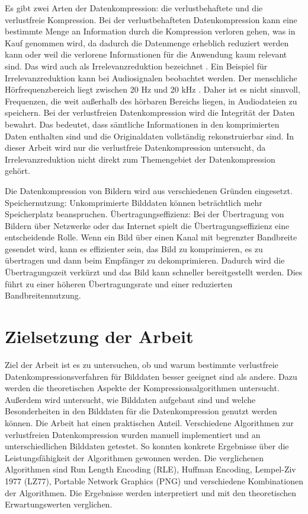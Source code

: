 \documentclass[conference]{IEEEtran}
\begin{document}
Es gibt zwei Arten der Datenkompression: die verlustbehaftete und die verlustfreie Kompression.
Bei der verlustbehafteten Datenkompression kann eine bestimmte Menge an Information durch die
Kompression verloren gehen, was in Kauf genommen wird, da dadurch die Datenmenge erheblich
reduziert werden kann oder weil die verlorene Informationen für die Anwendung kaum relevant sind.
Das wird auch als Irrelevanzreduktion bezeichnet \cite[S. 5]{Maluck}.
Ein Beispiel für Irrelevanzreduktion kann bei Audiosignalen beobachtet werden.
Der menschliche Hörfrequenzbereich liegt zwischen 20 Hz und 20 kHz \cite{Burke}.
Daher ist es nicht sinnvoll, Frequenzen, die weit außerhalb des hörbaren Bereichs liegen,
in Audiodateien zu speichern.
Bei der verlustfreien Datenkompression wird die Integrität der Daten bewahrt.
Das bedeutet, dass sämtliche Informationen in den komprimierten Daten enthalten sind
und die Originaldaten vollständig rekonstruierbar sind.
In dieser Arbeit wird nur die verlustfreie Datenkompression untersucht, da
Irrelevanzreduktion nicht direkt zum Themengebiet der Datenkompression gehört.

Die Datenkompression von Bildern wird aus verschiedenen Gründen eingesetzt.
Speichernutzung: Unkomprimierte Bilddaten können beträchtlich mehr Speicherplatz beanspruchen.
Übertragungseffizienz: Bei der Übertragung von Bildern über Netzwerke oder das Internet spielt
die Übertragungseffizienz eine entscheidende Rolle.
Wenn ein Bild über einen Kanal mit begrenzter Bandbreite gesendet wird, kann es effizienter
sein, das Bild zu komprimieren, es zu übertragen und dann beim Empfänger zu dekomprimieren.
Dadurch wird die Übertragungszeit verkürzt und das Bild kann schneller bereitgestellt werden.
Dies führt zu einer höheren Übertragungsrate und einer reduzierten Bandbreitennutzung.


\section{Zielsetzung der Arbeit}

Ziel der Arbeit ist es zu untersuchen, ob und warum bestimmte verlustfreie
Datenkompressionsverfahren für Bilddaten besser geeignet sind als andere.
Dazu werden die theoretischen Aspekte der Kompressionsalgorithmen untersucht.
Außerdem wird untersucht, wie Bilddaten aufgebaut sind und welche Besonderheiten
in den Bilddaten für die Datenkompression genutzt werden können.
Die Arbeit hat einen praktischen Anteil.
Verschiedene Algorithmen zur verlustfreien Datenkompression wurden manuell
implementiert und an unterschiedlichen Bilddaten getestet.
So konnten konkrete Ergebnisse über die Leistungsfähigkeit der Algorithmen gewonnen werden.
Die verglichenen Algorithmen sind Run Length Encoding (RLE), Huffman Encoding,
Lempel-Ziv 1977 (LZ77), Portable Network Graphics (PNG) und verschiedene 
Kombinationen der Algorithmen.
Die Ergebnisse werden interpretiert und mit den theoretischen Erwartungswerten verglichen.
\end{document}
